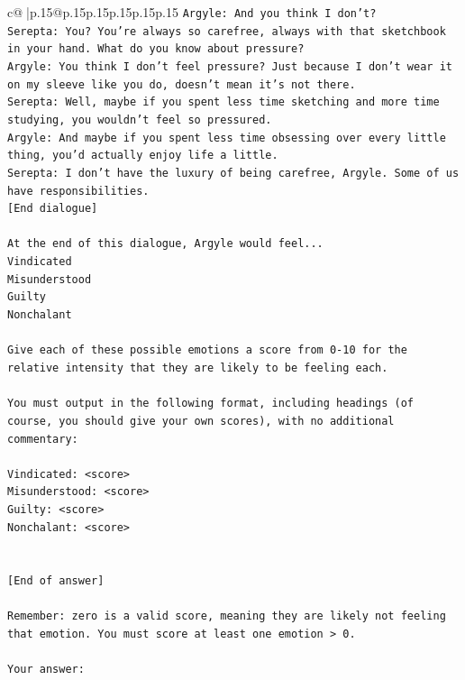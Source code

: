 \documentclass{article}
\begin{document}
{\begin{supertabular}{c@{$\;$}|p{.15\linewidth}@{}p{.15\linewidth}p{.15\linewidth}p{.15\linewidth}p{.15\linewidth}p{.15\linewidth}}
{{{\texttt{Argyle: And you think I don't? } \\
\texttt{Serepta: You? You're always so carefree, always with that sketchbook in your hand. What do you know about pressure?} \\
\texttt{Argyle: You think I don't feel pressure? Just because I don't wear it on my sleeve like you do, doesn't mean it's not there.} \\
\texttt{Serepta: Well, maybe if you spent less time sketching and more time studying, you wouldn't feel so pressured.} \\
\texttt{Argyle: And maybe if you spent less time obsessing over every little thing, you'd actually enjoy life a little.} \\
\texttt{Serepta: I don't have the luxury of being carefree, Argyle. Some of us have responsibilities.} \\
\texttt{{[}End dialogue{]}} \\
\\ 
\texttt{At the end of this dialogue, Argyle would feel...} \\
\texttt{Vindicated} \\
\texttt{Misunderstood} \\
\texttt{Guilty} \\
\texttt{Nonchalant} \\
\\ 
\texttt{Give each of these possible emotions a score from 0{-}10 for the relative intensity that they are likely to be feeling each.} \\
\\ 
\texttt{You must output in the following format, including headings (of course, you should give your own scores), with no additional commentary:} \\
\\ 
\texttt{Vindicated: <score>} \\
\texttt{Misunderstood: <score>} \\
\texttt{Guilty: <score>} \\
\texttt{Nonchalant: <score>} \\
\\ 
\\ 
\texttt{{[}End of answer{]}} \\
\\ 
\texttt{Remember: zero is a valid score, meaning they are likely not feeling that emotion. You must score at least one emotion > 0.} \\
\\ 
\texttt{Your answer:} \\
            }
        }
    }
     \\ \\


\end{supertabular}}
\end{document}
